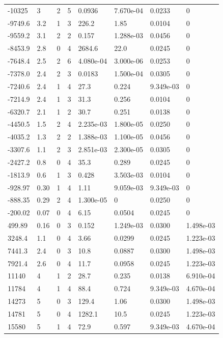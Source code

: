\documentclass[preview]{standalone}
\begin{document}
{{\begin{tabular}{L{1.2cm}C{1.2cm} C{0.3cm}C{0.5cm} C{1.4cm}C{1.4cm} C{1.4cm}C{1.4cm}}
  -10325  &     3  & 2     &  5 &  0.0936  & 7.670e-04  & 0.0233 &  0   \\ 
  -9749.6  &   3.2  & 1     &  3 &  226.2  & 1.85  & 0.0104 &  0   \\ 
  -9559.2  &   3.1  & 2     &  2 &  0.157  & 1.288e-03  & 0.0456 &  0   \\ 
  -8453.9  &   2.8  & 0     &  4 &  2684.6  & 22.0  & 0.0245 &  0   \\ 
  -7648.4  &   2.5  & 2     &  6 &  4.080e-04  & 3.000e-06  & 0.0253 &  0   \\ 
  -7378.0  &   2.4  & 2     &  3 &  0.0183  & 1.500e-04  & 0.0305 &  0   \\ 
  -7240.6  &   2.4  & 1     &  4 &  27.3  & 0.224  & 9.349e-03 &  0   \\ 
  -7214.9  &   2.4  & 1     &  3 &  31.3  & 0.256  & 0.0104 &  0   \\ 
  -6320.7  &   2.1  & 1     &  2 &  30.7  & 0.251  & 0.0138 &  0   \\ 
  -4450.5  &   1.5  & 2     &  4 &  2.235e-03  & 1.800e-05  & 0.0250 &  0   \\ 
  -4035.2  &   1.3  & 2     &  2 &  1.388e-03  & 1.100e-05  & 0.0456 &  0   \\ 
  -3307.6  &   1.1  & 2     &  3 &  2.851e-03  & 2.300e-05  & 0.0305 &  0   \\ 
  -2427.2  &   0.8  & 0     &  4 &  35.3  & 0.289  & 0.0245 &  0   \\ 
  -1813.9  &   0.6  & 1     &  3 &  0.428  & 3.503e-03  & 0.0104 &  0   \\ 
  -928.97  &  0.30  & 1     &  4 &  1.11  & 9.059e-03  & 9.349e-03 &  0   \\ 
  -888.35  &  0.29  & 2     &  4 &  1.300e-05  & 0  & 0.0250 &  0   \\ 
  -200.02  &  0.07  & 0     &  4 &  6.15  & 0.0504  & 0.0245 &  0   \\ 
  499.89  &  0.16  & 0     &  3 &  0.152  & 1.249e-03  & 0.0300 &  1.498e-03   \\ 
  3248.4  &   1.1  & 0     &  4 &  3.66  & 0.0299  & 0.0245 &  1.223e-03   \\ 
  7441.3  &   2.4  & 0     &  3 &  10.8  & 0.0887  & 0.0300 &  1.498e-03   \\ 
  7921.4  &   2.6  & 0     &  4 &  11.7  & 0.0958  & 0.0245 &  1.223e-03   \\ 
  11140  &     4  & 1     &  2 &  28.7  & 0.235  & 0.0138 &  6.910e-04   \\ 
  11784  &     4  & 1     &  4 &  88.4  & 0.724  & 9.349e-03 &  4.670e-04   \\ 
  14273  &     5  & 0     &  3 &  129.4  & 1.06  & 0.0300 &  1.498e-03   \\ 
  14781  &     5  & 0     &  4 &  1282.1  & 10.5  & 0.0245 &  1.223e-03   \\ 
  15580  &     5  & 1     &  4 &  72.9  & 0.597  & 9.349e-03 &  4.670e-04   \\ 
\hline 
\end{tabular} 

}}
\end{document}
